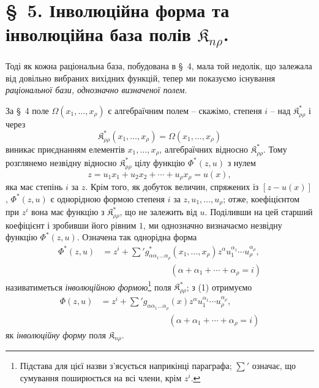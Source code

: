 \documentclass[11pt]{article}
\providecommand{\Kfield}{\mathfrak{K}}
\begin{document}
\section*{\S\ 5. Інволюційна форма та інволюційна база полів $\Kfield_{n\rho}$.}

Тоді як кожна раціональна база, побудована в \S\ 4, мала той недолік, що залежала від довільно вибраних вихідних функцій, тепер ми показуємо існування \emph{раціональної бази, однозначно визначеної полем}.

За \S\ 4 поле $\Omega(x_1,\ldots,x_\rho)$ є алгебраїчним полем -- скажімо, степеня $i$ -- над $\Kfield^*_{\rho\rho}$ і через
\[
  \Kfield^*_{\rho\rho}(x_1,
  \ldots,x_\rho)=\Omega(x_1,\ldots,x_\rho)
\]
виникає приєднанням елементів $x_1,\ldots,x_\rho$, алгебраїчних відносно $\Kfield^*_{\rho\rho}$. Тому розглянемо незвідну відносно $\Kfield^*_{\rho\rho}$ цілу функцію $\Phi^*(z,u)$ з нулем
\[
  z=u_1x_1+u_2x_2+\cdots+u_\rho x_\rho=u(x),
\]
яка має степінь $i$ за $z$. Крім того, як добуток величин, спряжених із $[z-u(x)]$, $\Phi^*(z,u)$ є однорідною формою степеня $i$ за $z,u_1,\ldots,u_\rho$; отже, коефіцієнтом при $z^i$ вона має функцію з $\Kfield^*_{\rho\rho}$, що не залежить від $u$. Поділивши на цей старший коефіцієнт і зробивши його рівним $1$, ми однозначно визначаємо незвідну функцію $\Phi^*(z,u)$. Означена так однорідна форма
\begin{equation}
\begin{aligned}
  \Phi^*(z,u)
  &=z^i+
    \sum{}' g^*_{\alpha\alpha_1\ldots\alpha_\rho}(x_1,
    \ldots,x_\rho)
    z^\alpha u_1^{\alpha_1}\cdots u_\rho^{\alpha_\rho},\\
  &\hspace{8em}(\alpha+\alpha_1+\cdots+\alpha_\rho=i)
\end{aligned}
\tag{1}
\end{equation}
називатиметься \emph{інволюційною формою}\footnote{Підстава для цієї назви з'ясується наприкінці параграфа; $\sum'$ означає, що сумування поширюється на всі члени, крім $z^i$.} поля $\Kfield^*_{\rho\rho}$; з (1) отримуємо
\begin{equation}
\begin{aligned}
  \Phi(z,u)
  &=z^i+
    \sum{}' g_{\alpha\alpha_1\ldots\alpha_\rho}(x)
    z^\alpha u_1^{\alpha_1}\cdots u_\rho^{\alpha_\rho},\\
  &\hspace{8em}(\alpha+\alpha_1+\cdots+\alpha_\rho=i)
\end{aligned}
\tag{2}
\end{equation}
як \emph{інволюційну форму} поля $\Kfield_{n\rho}$.
\end{document}
